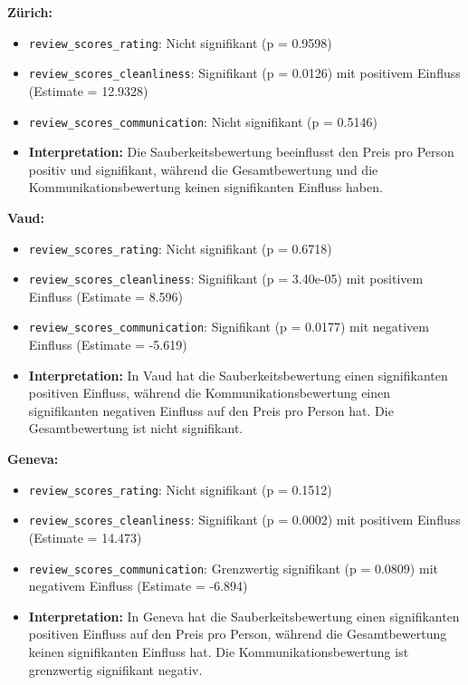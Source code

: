 \documentclass[
  journal,
]{IEEEtran}%
\begin{document}
\textbf{Zürich:}

\begin{itemize}
\item
  \texttt{review\_scores\_rating}: Nicht signifikant (p = 0.9598)
\item
  \texttt{review\_scores\_cleanliness}: Signifikant (p = 0.0126) mit
  positivem Einfluss (Estimate = 12.9328)
\item
  \texttt{review\_scores\_communication}: Nicht signifikant (p = 0.5146)
\item
  \textbf{Interpretation:} Die Sauberkeitsbewertung beeinflusst den
  Preis pro Person positiv und signifikant, während die Gesamtbewertung
  und die Kommunikationsbewertung keinen signifikanten Einfluss haben.
\end{itemize}

\textbf{Vaud:}

\begin{itemize}
\item
  \texttt{review\_scores\_rating}: Nicht signifikant (p = 0.6718)
\item
  \texttt{review\_scores\_cleanliness}: Signifikant (p = 3.40e-05) mit
  positivem Einfluss (Estimate = 8.596)
\item
  \texttt{review\_scores\_communication}: Signifikant (p = 0.0177) mit
  negativem Einfluss (Estimate = -5.619)
\item
  \textbf{Interpretation:} In Vaud hat die Sauberkeitsbewertung einen
  signifikanten positiven Einfluss, während die Kommunikationsbewertung
  einen signifikanten negativen Einfluss auf den Preis pro Person hat.
  Die Gesamtbewertung ist nicht signifikant.
\end{itemize}

\textbf{Geneva:}

\begin{itemize}
\item
  \texttt{review\_scores\_rating}: Nicht signifikant (p = 0.1512)
\item
  \texttt{review\_scores\_cleanliness}: Signifikant (p = 0.0002) mit
  positivem Einfluss (Estimate = 14.473)
\item
  \texttt{review\_scores\_communication}: Grenzwertig signifikant (p =
  0.0809) mit negativem Einfluss (Estimate = -6.894)
\item
  \textbf{Interpretation:} In Geneva hat die Sauberkeitsbewertung einen
  signifikanten positiven Einfluss auf den Preis pro Person, während die
  Gesamtbewertung keinen signifikanten Einfluss hat. Die
  Kommunikationsbewertung ist grenzwertig signifikant negativ.
\end{itemize}
\end{document}
